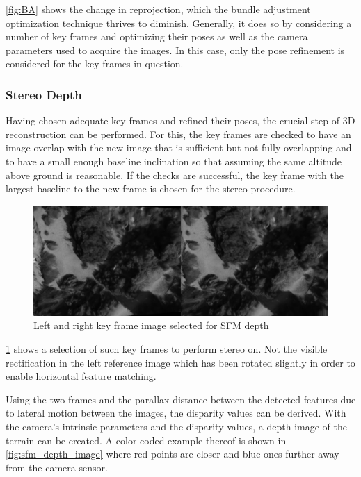 \cref{fig:BA} shows the change in reprojection, which the bundle adjustment optimization technique thrives to diminish. Generally, it does so by considering a number of key frames and optimizing their poses as well as the camera parameters used to acquire the images. In this case, only the pose refinement is considered for the key frames in question.

\subsubsection{Stereo Depth}

Having chosen adequate key frames and refined their poses, the crucial step of 3D reconstruction can be performed. For this, the key frames are checked to have an image overlap with the new image that is sufficient but not fully overlapping and to have a small enough baseline inclination so that assuming the same altitude above ground is reasonable. If the checks are successful, the key frame with the largest baseline to the new frame is chosen for the stereo procedure. 

\begin{figure}[h]
\centering
\includegraphics[scale=0.28]{images/system_overview/sfm_images.png}
\caption{Left and right key frame image selected for SFM depth}
\label{fig:sfm_images}
\end{figure}

\cref{fig:sfm_images} shows a selection of such key frames to perform stereo on. Not the visible rectification in the left reference image which has been rotated slightly in order to enable horizontal feature matching.

Using the two frames and the parallax distance between the detected features due to lateral motion between the images, the disparity values can be derived. With the camera's intrinsic parameters and the disparity values, a depth image of the terrain can be created. A color coded example thereof is shown in \cref{fig:sfm_depth_image} where red points are closer and blue ones further away from the camera sensor.

